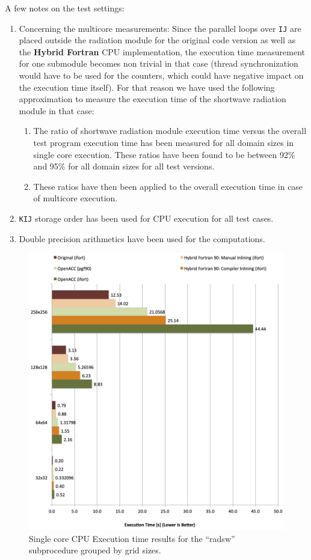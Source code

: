 A few notes on the test settings:
\begin{enumerate}
 \item Concerning the multicore measurements: Since the parallel loops over \verb|IJ| are placed outside the radiation module for the original code version as well as the \textbf{Hybrid Fortran} CPU implementation, the execution time measurement for one submodule becomes non trivial in that case (thread synchronization would have to be used for the counters, which could have negative impact on the execution time itself). For that reason we have used the following approximation to measure the execution time of the shortwave radiation module in that case:
  \begin{enumerate}
  \item The ratio of shortwave radiation module execution time versus the overall test program execution time has been measured for all domain sizes in single core execution. These ratios have been found to be between 92\% and 95\% for all domain sizes for all test versions.
  \item These ratios have then been applied to the overall execution time in case of multicore execution.
  \end{enumerate}
 \item \verb|KIJ| storage order has been used for CPU execution for all test cases.
 \item Double precision arithmetics have been used for the computations.
\end{enumerate}

\begin{figure}[htpb]
        \centering
        \includegraphics[width=14cm]{figures/verificationCPU1CoreExecTime}
        \caption[Single Core CPU Execution Time Results of Sample Implementation]{Single core CPU Execution time results for the ``radsw'' subprocedure grouped by grid sizes.}
        \label{figure:verificationCPU1CoreExecTime}
\end{figure}

